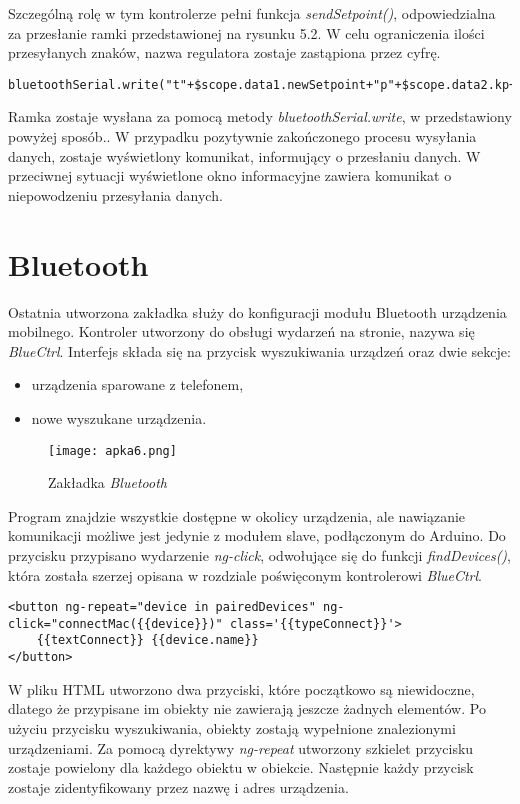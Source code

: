 Szczególną rolę w tym kontrolerze pełni funkcja \textit{sendSetpoint()}, odpowiedzialna za przesłanie ramki przedstawionej na rysunku 5.2. W celu ograniczenia ilości przesyłanych znaków, nazwa regulatora zostaje zastąpiona przez cyfrę.
\begin{lstlisting}
bluetoothSerial.write("t"+$scope.data1.newSetpoint+"p"+$scope.data2.kp+"i"+$scope.data3.ki+"d"+$scope.data4.kd+"r"+regulator+"h"+$scope.data5.hyst+"m"+$scope.data6.power+"/n")
\end{lstlisting}
Ramka zostaje wysłana za pomocą metody \textit{bluetoothSerial.write}, w przedstawiony powyżej sposób.. W przypadku pozytywnie zakończonego procesu wysyłania danych, zostaje wyświetlony komunikat, informujący o przesłaniu danych. W przeciwnej sytuacji wyświetlone okno informacyjne zawiera komunikat o niepowodzeniu przesyłania danych.

\section{Bluetooth}
Ostatnia utworzona zakładka służy do konfiguracji modułu Bluetooth urządzenia mobilnego. Kontroler utworzony do obsługi wydarzeń na stronie, nazywa się \textit{BlueCtrl}. Interfejs składa się na przycisk wyszukiwania urządzeń oraz dwie sekcje:
\begin{itemize}
\item urządzenia sparowane z telefonem,
\item nowe wyszukane urządzenia.
\end{itemize}
\begin{figure}[H]
	\centering
	\texttt{[image: apka6.png]}
	\caption{Zakładka \textit{Bluetooth}}
\end{figure}
Program znajdzie wszystkie dostępne w okolicy urządzenia, ale nawiązanie komunikacji możliwe jest jedynie z modułem slave, podłączonym do Arduino. Do przycisku przypisano wydarzenie \textit{ng-click}, odwołujące się do funkcji \textit{findDevices()}, która została szerzej opisana w rozdziale poświęconym kontrolerowi \textit{BlueCtrl}. 
\lstset{language=HTML}
\begin{lstlisting}
<button ng-repeat="device in pairedDevices" ng-click="connectMac({{device}})" class='{{typeConnect}}'>
	{{textConnect}} {{device.name}}
</button>
\end{lstlisting}
W pliku HTML utworzono dwa przyciski, które początkowo są niewidoczne, dlatego że przypisane im obiekty nie zawierają jeszcze żadnych elementów. Po użyciu przycisku wyszukiwania, obiekty zostają wypełnione znalezionymi urządzeniami. Za pomocą dyrektywy \textit{ng-repeat} utworzony szkielet przycisku zostaje powielony dla każdego obiektu w obiekcie. Następnie każdy przycisk zostaje zidentyfikowany przez nazwę i adres urządzenia.

